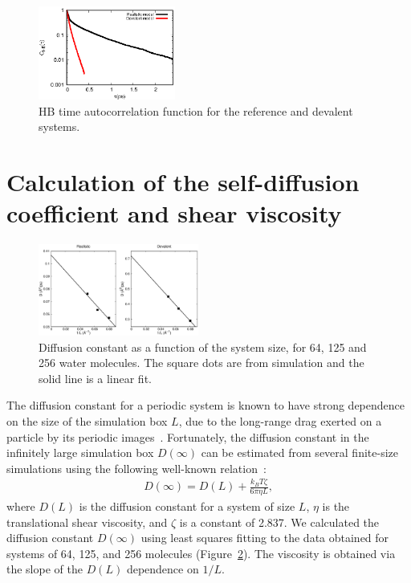 \documentclass[journal=jacsat,manuscript=article]{achemso}
\newcommand{\bea}{\begin{eqnarray}}
\newcommand{\eea}{\end{eqnarray}}
\begin{document}
\begin{figure}
\includegraphics[width=0.4\textwidth]{new_hbdecay}
\caption{HB time autocorrelation function for the reference and devalent systems.} \label{Fig:HBdecay}
\end{figure}

\section{Calculation of the self-diffusion coefficient and shear viscosity} 

\begin{figure}[t]
\includegraphics[width=0.47\textwidth]{msd}
\caption{Diffusion constant as a function of the system size, for 64, 125 and 256 water molecules. 
The square dots are from simulation and the solid line is a linear fit.}\label{Fig:dfs}
\end{figure} 

The diffusion constant for a periodic system is known to have strong dependence on the size of the simulation box $L$, due to the long-range drag exerted on a particle by its periodic images~\cite{dunweg1993molecular}. 
Fortunately, the diffusion constant in the infinitely large simulation box $D(\infty)$ can be estimated from several finite-size simulations using the following well-known relation~\cite{dunweg1993molecular}:
%
\bea
D(\infty) = D(L) + \frac{k_BT\zeta}{6\pi \eta L},
\eea
%
where $D(L)$ is the diffusion constant for a system of size $L$, $\eta$ is the translational shear viscosity, and $\zeta$ is a constant of 2.837. 
We calculated the diffusion constant $D(\infty)$ using least squares fitting to the data obtained for systems of 64, 125, and 256 molecules (Figure~\ref{Fig:dfs}). The viscosity is obtained via the slope of the $D(L)$ dependence on $1/L$.
\end{document}
